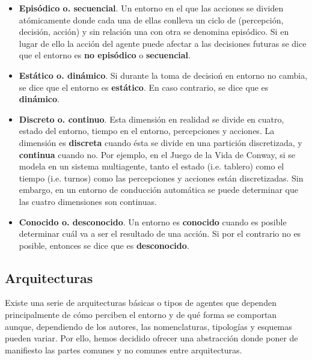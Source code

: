 \begin{itemize}
	\item \textbf{Episódico o. secuencial}. Un entorno en el que las acciones se dividen atómicamente donde cada una de ellas conlleva un ciclo de (percepción, decisión, acción) y sin relación una con otra se denomina episódico. Si en lugar de ello la acción del agente puede afectar a las decisiones futuras se dice que el entorno es \textbf{no episódico} o \textbf{secuencial}.
	\item \textbf{Estático o. dinámico}. Si durante la toma de decisioń en entorno no cambia, se dice que el entorno es \textbf{estático}. En caso contrario, se dice que es \textbf{dinámico}.
	\item \textbf{Discreto o. continuo}. Esta dimensión en realidad se divide en cuatro, estado del entorno, tiempo en el entorno, percepciones y acciones. La dimensión es \textbf{discreta} cuando ésta se divide en una partición discretizada, y \textbf{continua} cuando no. Por ejemplo, en el Juego de la Vida de Conway, si se modela en un sistema multiagente, tanto el estado (i.e. tablero) como el tiempo (i.e. turnos) como las percepciones y acciones están discretizadas. Sin embargo, en un entorno de conducción automática se puede determinar que las cuatro dimensiones son continuas.
	\item \textbf{Conocido o. desconocido}. Un entorno es \textbf{conocido} cuando es posible determinar cuál va a ser el resultado de una acción. Si por el contrario no es posible, entonces se dice que es \textbf{desconocido}.
\end{itemize}

\subsection{Arquitecturas}

Existe una serie de arquitecturas básicas o tipos de agentes que dependen principalmente de cómo perciben el entorno y de qué forma se comportan aunque, dependiendo de los autores, las nomenclaturas, tipologías y esquemas pueden variar. Por ello, hemos decidido ofrecer una abstracción donde poner de manifiesto las partes comunes y no comunes entre arquitecturas.

